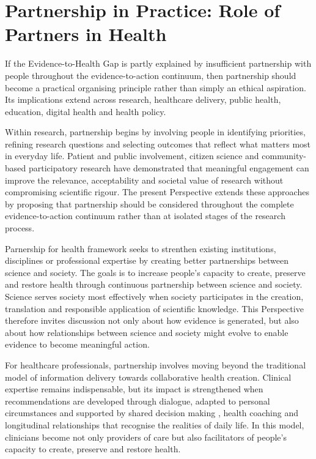 \documentclass{article}
\begin{document}
\section{Partnership in Practice: Role of Partners in Health}
\label{sec:org28d62bf}

If the Evidence-to-Health Gap is partly explained by insufficient partnership with people throughout the evidence-to-action continuum, then partnership should become a practical organising principle rather than simply an ethical aspiration. Its implications extend across research, healthcare delivery, public health, education, digital health and health policy.

Within research, partnership begins by involving people in identifying priorities, refining research questions and selecting outcomes that reflect what matters most in everyday life. Patient and public involvement, citizen science and community-based participatory research have demonstrated \cite{Bonney2009} \cite{Israel1998} \cite{Cargo2008} \cite{Greenhalgh2016} \cite{WHOIPCHS2016} \cite{PCORI2018} that meaningful engagement can improve the relevance, acceptability and societal value of research without compromising scientific rigour. The present Perspective extends these approaches by proposing that partnership should be considered throughout the complete evidence-to-action continuum rather than at isolated stages of the research process.

Parnership for health framework seeks to strenthen existing institutions, disciplines or professional expertise by creating better partnerships between science and society. The goals is to increase people's capacity to create, preserve and restore health through continuous partnership between science and society. Science serves society most effectively when society participates in the creation, translation and responsible application of scientific knowledge. This Perspective therefore invites discussion not only about how evidence is generated, but also about how relationships between science and society might evolve to enable evidence to become meaningful action.

For healthcare professionals, partnership involves moving beyond the traditional model of information delivery towards collaborative health creation. Clinical expertise remains indispensable, but its impact is strengthened when recommendations are developed through dialogue, adapted to personal circumstances and supported by shared decision making \cite{Elwyn2012} \cite{Charles1997}, health coaching \cite{Oberg2013} and longitudinal relationships that recognise the realities of daily life. In this model, clinicians become not only providers of care but also facilitators of people's capacity to create, preserve and restore health.
\end{document}
